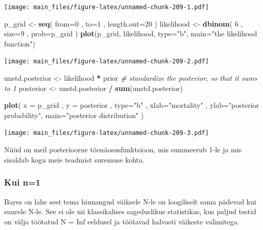\documentclass[]{book}
\newenvironment{Shaded}{\begin{snugshade}}{\end{snugshade}}
\newcommand{\KeywordTok}[1]{\textcolor[rgb]{0.13,0.29,0.53}{\textbf{#1}}}
\newcommand{\DataTypeTok}[1]{\textcolor[rgb]{0.13,0.29,0.53}{#1}}
\newcommand{\DecValTok}[1]{\textcolor[rgb]{0.00,0.00,0.81}{#1}}
\newcommand{\StringTok}[1]{\textcolor[rgb]{0.31,0.60,0.02}{#1}}
\newcommand{\CommentTok}[1]{\textcolor[rgb]{0.56,0.35,0.01}{\textit{#1}}}
\newcommand{\OperatorTok}[1]{\textcolor[rgb]{0.81,0.36,0.00}{\textbf{#1}}}
\newcommand{\NormalTok}[1]{#1}
\begin{document}
\texttt{[image: main\_files/figure-latex/unnamed-chunk-209-1.pdf]}

\begin{Shaded}
\begin{Highlighting}[]
\NormalTok{p_grid <-}\StringTok{ }\KeywordTok{seq}\NormalTok{( }\DataTypeTok{from=}\DecValTok{0}\NormalTok{ , }\DataTypeTok{to=}\DecValTok{1}\NormalTok{ , }\DataTypeTok{length.out=}\DecValTok{20}\NormalTok{ )}
\NormalTok{likelihood <-}\StringTok{ }\KeywordTok{dbinom}\NormalTok{( }\DecValTok{6}\NormalTok{ , }\DataTypeTok{size=}\DecValTok{9}\NormalTok{ , }\DataTypeTok{prob=}\NormalTok{p_grid )}
\KeywordTok{plot}\NormalTok{(p_grid, likelihood, }\DataTypeTok{type=}\StringTok{"b"}\NormalTok{, }\DataTypeTok{main=}\StringTok{"the likelihood function"}\NormalTok{)}
\end{Highlighting}
\end{Shaded}

\texttt{[image: main\_files/figure-latex/unnamed-chunk-209-2.pdf]}

\begin{Shaded}
\begin{Highlighting}[]
\NormalTok{unstd.posterior <-}\StringTok{ }\NormalTok{likelihood }\OperatorTok{*}\StringTok{ }\NormalTok{prior}
\CommentTok{# standardize the posterior, so that it sums to 1}
\NormalTok{posterior <-}\StringTok{ }\NormalTok{unstd.posterior }\OperatorTok{/}\StringTok{ }\KeywordTok{sum}\NormalTok{(unstd.posterior)}

\KeywordTok{plot}\NormalTok{( }\DataTypeTok{x =}\NormalTok{ p_grid , }\DataTypeTok{y =}\NormalTok{ posterior , }\DataTypeTok{type=}\StringTok{"b"}\NormalTok{ ,}
    \DataTypeTok{xlab=}\StringTok{"mortality"}\NormalTok{ , }\DataTypeTok{ylab=}\StringTok{"posterior probability"}\NormalTok{, }\DataTypeTok{main=}\StringTok{"posterior distribution"}\NormalTok{ )}
\end{Highlighting}
\end{Shaded}

\texttt{[image: main\_files/figure-latex/unnamed-chunk-209-3.pdf]}

Nüüd on meil posterioorne tõenäosusfunktsioon, mis summeerub 1-le ja mis
sisaldab kogu meie teadmist suremuse kohta.

\subsubsection{Kui n=1}\label{kui-n1}

Bayes on lahe sest tema hinnangud väiksele N-le on loogiliselt sama
pädevad kui suurele N-le. See ei ole nii klassikalises sageduslikus
statistikas, kus paljud testid on välja töötatud N = Inf eeldusel ja
töötavad halvasti väikeste valimitega.
\end{document}
